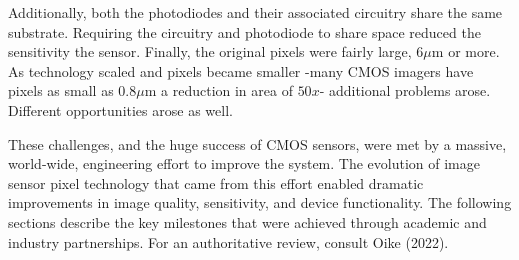 \documentclass[
  letterpaper,
]{book}
\begin{document}
Additionally, both the photodiodes and their associated circuitry share
the same substrate. Requiring the circuitry and photodiode to share
space reduced the sensitivity the sensor. Finally, the original pixels
were fairly large, \(6 \mu \text{m}\) or more. As technology scaled and
pixels became smaller -many CMOS imagers have pixels as small as
\(0.8 \mu \text{m}\) a reduction in area of \(50x\)- additional problems
arose. Different opportunities arose as well.

These challenges, and the huge success of CMOS sensors, were met by a
massive, world-wide, engineering effort to improve the system. The
evolution of image sensor pixel technology that came from this effort
enabled dramatic improvements in image quality, sensitivity, and device
functionality. The following sections describe the key milestones that
were achieved through academic and industry partnerships. For an
authoritative review, consult Oike (2022).
\end{document}
